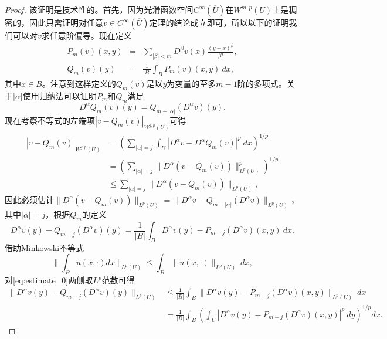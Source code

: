 \documentclass[a4paper,10pt]{ctexart}
\begin{document}
\begin{proof}
    该证明是技术性的。首先，因为光滑函数空间$ C^\infty(\overline{U}) $在$ W^{m,p}(U) $上是稠密的，因此只需证明对任意$ v\in C^\infty(\overline{U}) $定理的结论成立即可，所以以下的证明我们可以对$ v $求任意阶偏导。现在定义
    \begin{eqnarray}
        P_m(v)(x,y) &=& \sum_{|\beta|< m} D^\beta v(x) \frac{(y-x)^\beta}{\beta!},\label{eq:P_m}\\
        Q_m(v)(y) &=& \frac{1}{|B|} \int_B P_m(v)(x,y)\ dx,\label{eq:Q_m}
    \end{eqnarray}
    其中$ x\in B $。注意到这样定义的$ Q_m(v) $是以$ y $为变量的至多$ m-1 $阶的多项式。关于$ |\alpha| $使用归纳法可以证明$ P_m $和$ Q_m $满足
    \begin{equation}
        D^\alpha Q_m(v)(y) = Q_{m-|\alpha|}(D^\alpha v)(y).
    \end{equation}
    现在考察不等式的左端项$ |v-Q_m(v)|_{W^{j,p}(U)} $可得
    \[
        \begin{aligned}
            |v-Q_m(v)|_{W^{j,p}(U)} &= \left( \sum_{|\alpha|=j} \int_U |D^\alpha v - D^\alpha Q_m(v)|^p\ dx \right)^{1 / p} \\
            &= \left( \sum_{|\alpha|=j} \| D^\alpha (v - Q_m(v)) \|^p_{L^p(U)} \right)^{1 / p} \\
            &\leqslant \sum_{|\alpha|=j} \| D^\alpha (v - Q_m(v)) \|_{L^p(U)},
        \end{aligned}
    \]
    因此必须估计$ \| D^\alpha (v - Q_m(v)) \|_{L^p(U)} = \| D^\alpha v - Q_{m-|\alpha|}(D^\alpha v)\|_{L^p(U)} $，其中$ |\alpha|=j $，根据$ Q_m $的定义
    \begin{equation}\label{eq:estimate_0}
        D^\alpha v(y) - Q_{m-j}(D^\alpha v)(y) = \frac{1}{|B|} \int_B D^\alpha v(y) - P_{m-j}(D^\alpha v)(x,y)\ dx.
    \end{equation}
    借助Minkowski不等式
    \[
        \| \int_B u(x,\cdot)dx \|_{L^p(U)} \leqslant  \int_B \| u(x,\cdot) \|_{L^p(U)}\ dx,
    \]
    对\eqref{eq:estimate_0}两侧取$ L^p $范数可得
    \begin{equation}\label{eq:estimate_2}
        \begin{aligned}
            \| D^\alpha v(y) - Q_{m-j}(D^\alpha v)(y) \|_{L^p(U)} 
            &\leqslant \frac{1}{|B|} \int_B \| D^\alpha v(y) - P_{m-j}(D^\alpha v)(x,y) \|_{L^p(U)}\ dx\\
            &= \frac{1}{|B|} \int_B \left( \int_U |D^\alpha v(y) - P_{m-j}(D^\alpha v)(x,y)|^p\ dy \right)^{1 / p} dx.
        \end{aligned}

\end{equation}
\end{proof}
\end{document}
